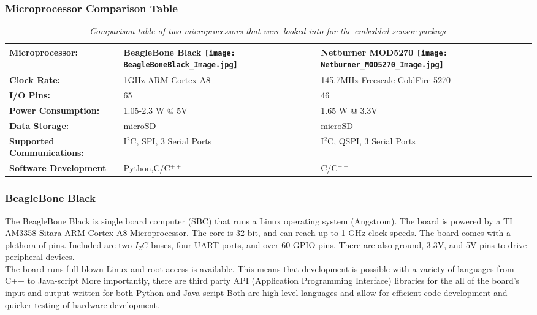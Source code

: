\subsubsection{Microprocessor Comparison Table}
\begin{table}
\centering
\begin{tabular}{|l| p{3cm} | p{3cm} |}
\hline
\textbf{Microprocessor:} & BeagleBone Black 
\texttt{[image: BeagleBoneBlack\_Image.jpg]}
& Netburner MOD5270
\texttt{[image: Netburner\_MOD5270\_Image.jpg]}
\\
\hline
\textbf{Clock Rate:}		&1GHz ARM Cortex-A8& 145.7MHz 
Freescale ColdFire 5270 \\
\hline
\textbf{I/O Pins:}		& 65  &46\\
\hline
\textbf{Power Consumption:}&	1.05-2.3 W @ 5V	& 1.65 W @ 3.3V	\\
\hline
\textbf{Data Storage:}	&			microSD		&	microSD	\\
\hline
\textbf{Supported Communications:}&	I$^2$C, SPI, 3 Serial 
Ports		&I$^2$C, QSPI, 3 Serial Ports		\\
\hline
\textbf{Software Development}&Python,C/C$^{++}$&C/C$^{++}$\\
\hline
\end{tabular}
\caption{\textit{Comparison table of two microprocessors that 
were looked into for the embedded sensor package}}
\label{tab:uProcOptions}
\end{table}

\subsubsection{BeagleBone Black}
\label{subsec:BeagleBoneBlack}
\indent The BeagleBone Black is single board computer (SBC) that
runs a Linux operating system (Angstrom). The board is powered by a
TI AM3358 Sitara ARM Cortex-A8 Microprocessor. The core is 32 bit,
and can reach up to 1 GHz clock speeds. The board comes with a
plethora of pins. Included are two $I_2C$ buses, four UART
ports, and over 60 GPIO pins. There are also ground, 3.3V, and
5V pins to drive peripheral devices. \\

\indent The board runs full blown Linux and root access is
available. This means that development is possible with a variety
of languages from C++ to Java-script More importantly, there are
third party API (Application Programming Interface) libraries for
the all of the board's input and output written for both Python
and Java-script Both are high level languages and allow for
efficient code development and quicker testing of hardware
development. 


